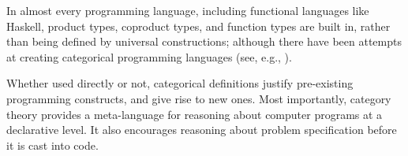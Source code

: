 In almost every programming language, including functional languages
like Haskell, product types, coproduct types, and function types are
built in, rather than being defined by universal constructions; although
there have been attempts at creating categorical programming languages
(see, e.g.,
).

Whether used directly or not, categorical definitions justify
pre-existing programming constructs, and give rise to new ones. Most
importantly, category theory provides a meta-language for reasoning
about computer programs at a declarative level. It also encourages
reasoning about problem specification before it is cast into code.
